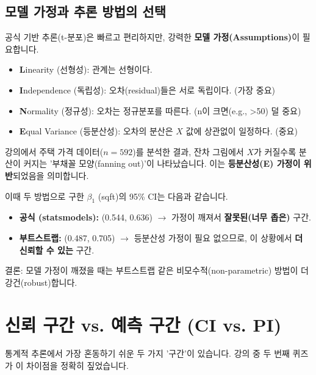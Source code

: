 \documentclass[11pt,a4paper]{book}
\theoremstyle{definition}
\begin{document}
\subsection{모델 가정과 추론 방법의 선택}

공식 기반 추론(t-분포)은 빠르고 편리하지만, 강력한 \textbf{모델 가정(Assumptions)}이 필요합니다.

\begin{itemize}
    \item \textbf{L}inearity (선형성): 관계는 선형이다.
    \item \textbf{I}ndependence (독립성): 오차(residual)들은 서로 독립이다. (가장 중요)
    \item \textbf{N}ormality (정규성): 오차는 정규분포를 따른다. (n이 크면(e.g., >50) 덜 중요)
    \item \textbf{E}qual Variance (등분산성): 오차의 분산은 $X$ 값에 상관없이 일정하다. (중요)
\end{itemize}

\begin{tcolorbox}[title={사례: 공식(statsmodels) vs. 부트스트랩}]
    강의에서 주택 가격 데이터($n=592$)를 분석한 결과, 잔차 그림에서 $X$가 커질수록 분산이 커지는 '부채꼴 모양(fanning out)'이 나타났습니다. 이는 \textbf{등분산성(E) 가정이 위반}되었음을 의미합니다.

    이때 두 방법으로 구한 $\beta_1$ (sqft)의 95\% CI는 다음과 같습니다.
    \begin{itemize}
        \item \textbf{공식 (statsmodels):} (0.544, 0.636) $\rightarrow$ 가정이 깨져서 \textbf{잘못된(너무 좁은)} 구간.
        \item \textbf{부트스트랩:} (0.487, 0.705) $\rightarrow$ 등분산성 가정이 필요 없으므로, 이 상황에서 \textbf{더 신뢰할 수 있는} 구간.
    \end{itemize}
    결론: 모델 가정이 깨졌을 때는 부트스트랩 같은 비모수적(non-parametric) 방법이 더 강건(robust)합니다.
\end{tcolorbox}


\section{신뢰 구간 vs. 예측 구간 (CI vs. PI)}

통계적 추론에서 가장 혼동하기 쉬운 두 가지 '구간'이 있습니다.
강의 중 두 번째 퀴즈가 이 차이점을 정확히 짚었습니다.
\end{document}
